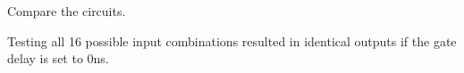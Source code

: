 \documentclass[11pt]{article}
\begin{document}
\begin{question}
	Compare the circuits.

	Testing all 16 possible input combinations resulted in identical outputs
	if the gate delay is set to 0ns.
\end{question}
\end{document}
